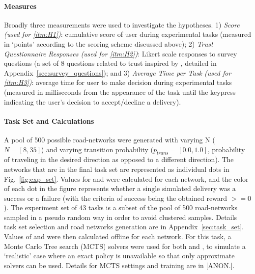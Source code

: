     \noindent \paragraph{Measures}
    Broadly three measurements were used to investigate the hypotheses. 1) \emph{Score (used for \ref{itm:H1})}: cumulative score of user during experimental tasks (measured in `points' according to the scoring scheme discussed above); 2) \emph{Trust Questionnaire Responses (used for \ref{itm:H2})}: Likert scale responses to survey questions (a set of 8 questions related to trust inspired by \cite{Muir1996-gt}, detailed in Appendix~\ref{sec:survey_questions}); and 3) \emph{Average Time per Task (used for \ref{itm:H3})}: average time for user to make decision during experimental tasks (measured in milliseconds from the appearance of the task until the keypress indicating the user's decision to accept/decline a delivery).

    \noindent \paragraph{Task Set and \famsec{} Calculations}
    A pool of 500 possible road-networks were generated with varying N ($N=[8,35]$) and varying transition probability ($p_{trans}=[0.0,1.0]$, probability of traveling in the desired direction as opposed to a different direction). The networks that are in the final task set are represented as individual dots in Fig.~\ref{fig:exp_set}. Values for \xQ{} and \xO{} were calculated for each network, and the color of each dot in the figure represents whether a single simulated delivery was a success or a failure (with the criteria of success being the obtained reward $ >= 0$). The experiment set of 43 tasks is a subset of the pool of 500 road-networks sampled in a pseudo random way in order to avoid clustered samples. Details task set selection and road networks generation are in Appendix~\ref{sec:task_set}. Values of \xQ{} and \xO{} were then calculated offline for each network. 
    For this task, a Monte Carlo Tree search (MCTS) solvers were used for both \solvetrust{} and \solvecand{}, to simulate a `realistic' case where an exact policy is unavailable so that only approximate solvers can be used. 
    Details for MCTS settings and training \surrogate{} are in [ANON.]. 

